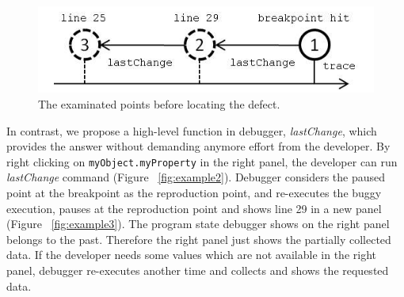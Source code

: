 \documentclass[preprint]{sigplanconf}
\begin{document}
\begin{figure}[htp]
\includegraphics{5-example-points.jpg}
\caption{The examinated points before locating the defect.}
\label{fig:example-points}
\end{figure}

In contrast, we propose a high-level function in debugger, \textit{lastChange}, which provides the answer without demanding anymore effort from the developer. By right clicking on \texttt{myObject.myProperty} in the right panel, the developer can run \textit{lastChange} command (Figure ~\ref{fig:example2}). Debugger considers the paused point at the breakpoint as the reproduction point, and re-executes the buggy execution, pauses at the reproduction point and shows line 29 in a new panel (Figure ~\ref{fig:example3}). The program state debugger shows on the right panel belongs to the past. Therefore the right panel just shows the partially collected data. If the developer needs some values which are not available in the right panel, debugger re-executes another time and collects and shows the requested data. 
\end{document}
